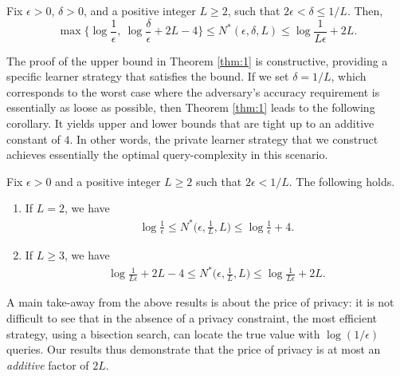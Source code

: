 \documentclass[final,12pt]{colt2018}
\begin{document}
\begin{theorem}
\label{thm:1}
Fix $\epsilon>0$, $\delta>0$, and a positive integer $L\geq 2$, such that $2\epsilon< \delta\leq{1}/{L}$. Then,
\begin{equation} 
\max\Big\{\log\frac{1}{\epsilon},\:\log\frac{\delta}{\epsilon}+2L-4\Big\} \leq N^*(\epsilon,\delta,L)\leq \log\frac{1}{L\epsilon}+2L.
\end{equation}
\end{theorem} 

The proof of  the upper bound in Theorem \ref{thm:1} is constructive, providing a specific {learner} strategy that satisfies the bound. 
If we set $\delta={1}/{L}$, which corresponds to the worst case where the adversary's accuracy requirement is essentially as loose as possible, then Theorem \ref{thm:1} leads to the following  corollary. It yields upper and lower bounds that are tight up to an additive constant of $4$. In other words, the private {learner} strategy that we construct  achieves essentially the optimal query-complexity in this scenario. 

\begin{corollary} \label{cor:1}
Fix $\epsilon>0$ and a positive integer $L\geq 2$ such that $2\epsilon< 1/L$. The following holds. 
\begin{enumerate}
	\item If $L=2$, we have
	\begin{equation}
\begin{split}
\log\frac{1}{\epsilon} \leq N^*\Big(\epsilon,\frac{1}{L},L\Big)\leq \log\frac{1}{\epsilon}+4.
\end{split}
\end{equation}
\item If $L\geq 3$, we have
\begin{equation} \label{theorem_bound_L}
\begin{split}
\log\frac{1}{L\epsilon}+2L-4 \leq N^*\Big(\epsilon,\frac{1}{L},L\Big)\leq \log\frac{1}{L\epsilon}+2L.
\end{split}
\end{equation}
\end{enumerate}
\end{corollary} 
A main take-away from the above results is about the price of privacy: it is not difficult to see that in the absence of a privacy constraint, the most efficient {strategy, using a bisection search,} can locate the true value with $\log({1}/{\epsilon})$ queries. Our results thus demonstrate that the {price of privacy is at most an \emph{additive} factor of $2L$.} 
\end{document}
